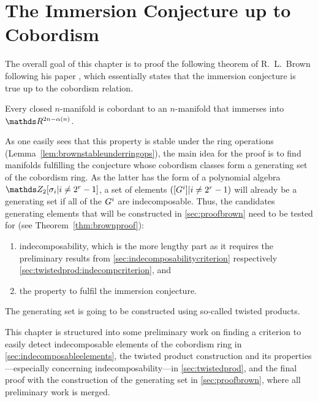 % 

\chapter{The Immersion Conjecture up to Cobordism}\label{chap:brown}
The overall goal of this chapter is to proof the following theorem of
R.~L.~Brown following his paper \cite{brown},
which essentially states that the immersion conjecture is true up to
the cobordism relation.
\begin{Thm}[Brown]\label{thm:brown}
  Every closed $n$-manifold is cobordant to an $n$-manifold that immerses
  into $\R^{2n-\alpha(n)}$.
\end{Thm}

As one easily sees that this property is stable under
the ring operations (Lemma~\ref{lem:brownstableunderringops}),
the main idea for the proof is to find manifolds
fulfilling the conjecture whose cobordism classes form a generating set
of the cobordism ring.
As the latter has the form of a polynomial algebra
$\Zmod2[\sigma_i|i\neq 2^r-1]$, a set of elements
$([G^{i}]|i\neq2^r-1)$ will already be a generating set if all of the
$G^{i}$ are indecomposable.
Thus, the candidates generating elements that will be constructed
in \autoref{sec:proofbrown} need to be tested for (see
Theorem~\ref{thm:brownproof}):
\begin{enumerate}
\item indecomposability, which is the more lengthy part as it
  requires the preliminary results from
  \autoref{sec:indecomposabilitycriterion} respectively
  \autoref{sec:twistedprod:indecompcriterion}, and
\item the property to fulfil the immersion conjecture.
\end{enumerate}
The generating set is going to be constructed using so-called twisted
products.

This chapter is structured into some preliminary work on finding a
criterion to easily detect indecomposable elements of the cobordism
ring in \autoref{sec:indecomposableelements},
the twisted product construction and its properties---especially
concerning indecomposability---in
\autoref{sec:twistedprod}, and the final proof with the construction
of the generating set in \autoref{sec:proofbrown}, where all
preliminary work is merged.

